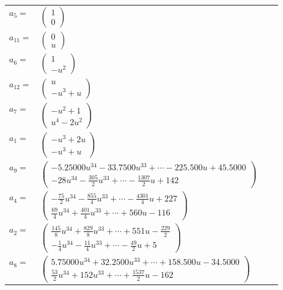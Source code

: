 \documentclass[1p]{elsarticle_modified}
\theoremstyle{definition}
\begin{document}
\begin{tabular}{m{7pt} m{180pt} m{7pt} m{180pt} }
\flushright $a_{5}=$&$\begin{pmatrix}1\\0\end{pmatrix}$ \\
\flushright $a_{11}=$&$\begin{pmatrix}0\\u\end{pmatrix}$ \\
\flushright $a_{6}=$&$\begin{pmatrix}1\\- u^2\end{pmatrix}$ \\
\flushright $a_{12}=$&$\begin{pmatrix}u\\- u^3+u\end{pmatrix}$ \\
\flushright $a_{7}=$&$\begin{pmatrix}- u^2+1\\u^4-2 u^2\end{pmatrix}$ \\
\flushright $a_{1}=$&$\begin{pmatrix}- u^3+2 u\\- u^3+u\end{pmatrix}$ \\
\flushright $a_{9}=$&$\begin{pmatrix}-5.25000 u^{34}-33.7500 u^{33}+\cdots-225.500 u+45.5000\\-28 u^{34}-\frac{305}{2} u^{33}+\cdots-\frac{1307}{2} u+142\end{pmatrix}$ \\
\flushright $a_{4}=$&$\begin{pmatrix}-\frac{75}{2} u^{34}-\frac{855}{4} u^{33}+\cdots-\frac{4301}{4} u+227\\\frac{69}{4} u^{34}+\frac{401}{4} u^{33}+\cdots+560 u-116\end{pmatrix}$ \\
\flushright $a_{2}=$&$\begin{pmatrix}\frac{145}{8} u^{34}+\frac{829}{8} u^{33}+\cdots+551 u-\frac{229}{2}\\-\frac{1}{4} u^{34}-\frac{11}{4} u^{33}+\cdots-\frac{49}{2} u+5\end{pmatrix}$ \\
\flushright $a_{8}=$&$\begin{pmatrix}5.75000 u^{34}+32.2500 u^{33}+\cdots+158.500 u-34.5000\\\frac{53}{2} u^{34}+152 u^{33}+\cdots+\frac{1537}{2} u-162\end{pmatrix}$ \\

\end{tabular}
\end{document}
